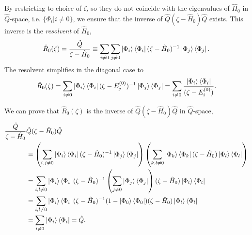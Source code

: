 By restricting to choice of $\zeta$, so they do not coincide with the eigenvalues
of $\hat{H}_0$ in $\hat{Q}$-space, i.e. $\{\Phi_i | i \neq 0\}$, we ensure that the inverse of 
$\hat{Q}(\zeta - \hat{H}_0)\hat{Q}$ exists. This inverse is the \emph{resolvent} of
$\hat{H}_0$,
\begin{equation}
    \hat{R}_0(\zeta) = \frac{\hat{Q}}{\zeta - \hat{H}_0}
        \equiv \sum_{i \neq 0} \sum_{j \neq 0}
            \ket{\Phi_i}\bra{\Phi_i} 
            (\zeta - \hat{H}_0)^{-1}
            \ket{\Phi_j}\bra{\Phi_j}.
\end{equation}
The resolvent simplifies in the diagonal case to
\begin{equation}
    \hat{R}_0(\zeta)
        = \sum_{i \neq 0} \ket{\Phi_i} \bra{\Phi_i}
            (\zeta - E_j^{(0)})^{-1} \ket{\Phi_j}\bra{\Phi_j}
        = \sum_{i \neq 0} \frac{\ket{\Phi_i} \bra{\Phi_i}}{(\zeta - E_i^{(0)})}. 
\end{equation}

We can prove that $\hat{R}_0(\zeta)$ is the inverse of
$\hat{Q}(\zeta - \hat{H}_0)\hat{Q}$ in $\hat{Q}$-space,
\begin{equation}
    \begin{aligned}
        \frac{\hat{Q}}{\zeta - \hat{H}_0} &\hat{Q}(\zeta - \hat{H}_0)\hat{Q} \\
            &= \left(
                \sum_{i,j \neq 0} \ket{\Phi_i}\bra{\Phi_i}
                    (\zeta - \hat{H}_0)^{-1} \ket{\Phi_j}\bra{\Phi_j}
            \right) \left(
                \sum_{k,l \neq 0} \ket{\Phi_k}\bra{\Phi_k}
                    (\zeta - \hat{H}_0) \ket{\Phi_l}\bra{\Phi_l}
            \right) \\
            &= \sum_{i,l \neq 0} \ket{\Phi_i}
                \bra{\Phi_i}
                    (\zeta - \hat{H}_0)^{-1}
                    \left(\sum_{j \neq 0} \ket{\Phi_j} \bra{\Phi_j} \right)
                    (\zeta - \hat{H}_0)
                \ket{\Phi_l}
            \bra{\Phi_l} \\
            &= \sum_{i, l \neq 0} \ket{\Phi_i}
                \bra{\Phi_i} (\zeta - \hat{H}_0)^{-1}
                (1 - \ket{\Phi_0}\bra{\Phi_0})
                (\zeta - \hat{H}_0) \ket{\Phi_l}
            \bra{\Phi_l} \\
            &= \sum_{i \neq 0} \ket{\Phi_i}\bra{\Phi_i} = \hat{Q}.
    \end{aligned}
\end{equation}

